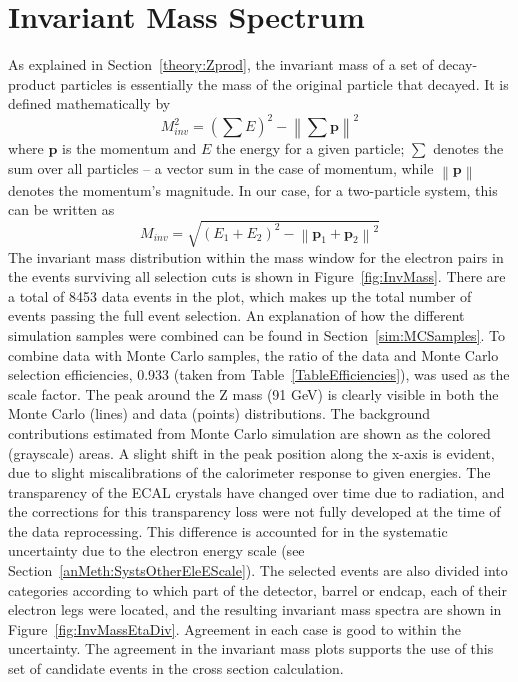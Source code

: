 \section{Invariant Mass Spectrum} %
\label{anMeth:invmass}
As explained in Section~\ref{theory:Zprod}, %
the invariant mass of a set of decay-product particles is 
essentially the mass of the original particle that decayed. 
It is defined mathematically by %
\[
M_{inv}^2 = \left( \sum E \right)^2 - \left\| \sum \mathbf{p} \right\|^2
\]
where $ \mathbf{p} $ is the momentum 
and $ E $ the energy for a given particle; 
$ \sum $ denotes the sum over all particles 
-- a vector sum in the case of momentum, 
while $\left\| \mathbf{p} \right\|$ denotes the momentum's magnitude.  
In our case, for a two-particle system, this can be written as 
\[
M_{inv} = \sqrt{ \left(E_1 + E_2\right)^2 - \left\|\mathbf{p}_1 + \mathbf{p}_2\right\|^2 }
\]
The invariant mass distribution within the mass window 
for the electron pairs 
in the events surviving all selection cuts is shown in 
Figure~\ref{fig:InvMass}.  
There are a total of 8453 data events in the plot, 
which makes up the total number of events passing 
the full event selection.  
An explanation of how the different simulation 
samples were combined can be 
found in Section~\ref{sim:MCSamples}.  
To combine data with Monte Carlo samples, 
the ratio of the data and Monte Carlo selection efficiencies, 
0.933 (taken from Table~\ref{TableEfficiencies}), 
was used as the scale factor.  
The peak around the Z mass (91 GeV) is clearly visible 
in both the Monte Carlo (lines) and data (points) distributions.  
The background contributions estimated from Monte Carlo simulation 
are shown as the colored (grayscale) areas.  
A slight shift in the peak position along the x-axis is 
evident, due to slight miscalibrations of 
the calorimeter response to given energies.  
The transparency of the ECAL crystals 
have changed over time 
due to radiation, 
and the corrections for this transparency loss 
were not fully developed at the time of the 
data reprocessing.  %
This difference is accounted for in the 
systematic uncertainty due to the electron energy scale 
(see Section~\ref{anMeth:SystsOtherEleEScale}).  
The selected events are also divided into categories according 
to which part of the detector, barrel or endcap, 
each of their electron legs were located, 
and the resulting invariant mass spectra are 
shown in Figure~\ref{fig:InvMassEtaDiv}.  
Agreement in each case is good to within the 
uncertainty.  
The agreement in the invariant mass plots supports 
the use of this set of candidate events in 
the cross section calculation.  

